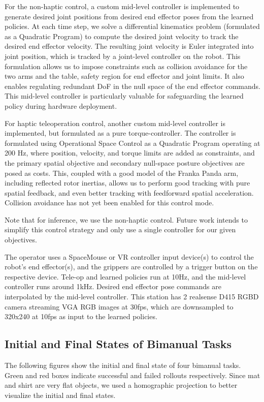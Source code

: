 For the non-haptic control, a custom mid-level controller is implemented to generate desired joint positions from desired end effector poses from the learned policies. At each time step, we solve a differential kinematics problem (formulated as a Quadratic Program) to compute the desired joint velocity to track the desired end effector velocity. The resulting joint velocity is Euler integrated into joint position, which is tracked by a joint-level controller on the robot. This formulation allows us to impose constraints such as collision avoidance for the two arms and the table, safety region for end effector and joint limits. It also enables regulating redundant DoF in the null space of the end effector commands. This mid-level controller is particularly valuable for safeguarding the learned policy during hardware deployment.

For haptic teleoperation control, another custom mid-level controller is implemented, but formulated as a pure torque-controller. The controller is formulated using Operational Space Control \citet{khatib1987osc} as a Quadratic Program operating at 200 Hz, where position, velocity, and torque limits are added as constraints, and the primary spatial objective and secondary null-space posture objectives are posed as costs.
This, coupled with a good model of the Franka Panda arm, including reflected rotor inertias, allows us to perform
good tracking with pure spatial feedback, and even better tracking with feedforward spatial acceleration.
Collision avoidance has not yet been enabled for this control mode.

Note that for inference, we use the non-haptic control. Future work intends to simplify
this control strategy and only use a single controller for our given objectives.

The operator uses a SpaceMouse or VR controller input device(s) to control the robot's end effector(s), and the grippers are controlled by a trigger button on the respective device. Tele-op and learned policies run at 10Hz, and the mid-level controller runs around 1kHz. Desired end effector pose commands are interpolated by the mid-level controller. This station has 2 realsense D415 RGBD camera streaming VGA RGB images at 30fps, which are downsampled to 320x240 at 10fps as input to the learned policies.

\subsection{Initial and Final States of Bimanual Tasks}
\label{sec:bimanual_ini_fial}
The following figures show the initial and final state of four bimanual tasks. Green and red boxes indicate successful and failed rollouts respectively. Since mat and shirt are very flat objects, we used a homographic projection to better visualize the initial and final states.

